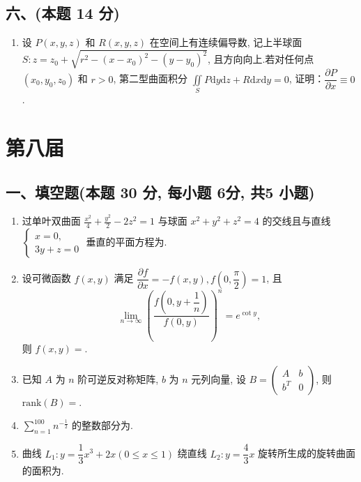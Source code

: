 \subsection*{六、(本题 14 分)}
\begin{enumerate}[start=10]
    \item 设 $P(x, y, z)$ 和 $R(x, y, z)$ 在空间上有连续偏导数, 记上半球面 $S: z = z_0 + \sqrt{r^2 - (x - x_0)^2 - (y - y_0)^2}$, 且方向向上.若对任何点 $(x_0, y_0, z_0)$ 和 $r > 0$, 第二型曲面积分 $\displaystyle\iint\limits_{S} P \mathrm{d}y \mathrm{d}z + R \mathrm{d}x \mathrm{d}y = 0$, 证明：$\dfrac{\partial P}{\partial x} \equiv 0$.
\end{enumerate}


\newpage
\section{第八届}

\subsection*{一、填空题(本题 30 分,  每小题 6分,  共5 小题)}
\begin{enumerate}
    \item 过单叶双曲面 $\frac{x^2}{4} + \frac{y^2}{2} - 2z^2 = 1$ 与球面 $x^2 + y^2 + z^2 = 4$ 的交线且与直线
          $\begin{cases}
                  x = 0, \\
                  3y + z = 0
              \end{cases}$
          垂直的平面方程为\underline{\quad \quad}.
    \item 设可微函数 $f(x, y)$ 满足 $\dfrac{\partial f}{\partial x} = -f(x, y), f\left(0, \dfrac{\pi}{2}\right) = 1$, 且
          \[
              \lim_{n \to \infty} \left( \frac{f\left(0, y + \dfrac{1}{n}\right)}{f(0, y)} \right)^n = e^{\cot y},
          \]
          则 $f(x, y) =$\underline{\quad \quad}.
    \item 已知 $A$ 为 $n$ 阶可逆反对称矩阵, $b$ 为 $n$ 元列向量, 设 $B = \left( \begin{array}{cc} A & b \\ b^T & 0 \end{array} \right)$, 则 $\text{rank}(B) =$\underline{\quad \quad}.
    \item $\displaystyle\sum_{n=1}^{100} n^{-\frac{1}{2}}$ 的整数部分为\underline{\quad \quad}.
    \item 曲线 $L_1: y = \dfrac{1}{3}x^3 + 2x (0 \leqslant x \leqslant 1)$ 绕直线 $L_2: y = \dfrac{4}{3}x$ 旋转所生成的旋转曲面的面积为\underline{\quad \quad}.
\end{enumerate}

